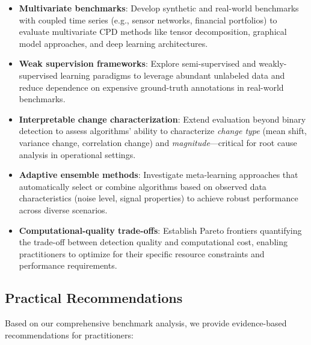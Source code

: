 \begin{itemize}
    \item \textbf{Multivariate benchmarks}: Develop synthetic and real-world benchmarks with coupled time series (e.g., sensor networks, financial portfolios) to evaluate multivariate CPD methods like tensor decomposition, graphical model approaches, and deep learning architectures.
    
    \item \textbf{Weak supervision frameworks}: Explore semi-supervised and weakly-supervised learning paradigms to leverage abundant unlabeled data and reduce dependence on expensive ground-truth annotations in real-world benchmarks.
    
    \item \textbf{Interpretable change characterization}: Extend evaluation beyond binary detection to assess algorithms' ability to characterize \textit{change type} (mean shift, variance change, correlation change) and \textit{magnitude}—critical for root cause analysis in operational settings.
    
    \item \textbf{Adaptive ensemble methods}: Investigate meta-learning approaches that automatically select or combine algorithms based on observed data characteristics (noise level, signal properties) to achieve robust performance across diverse scenarios.
    
    \item \textbf{Computational-quality trade-offs}: Establish Pareto frontiers quantifying the trade-off between detection quality and computational cost, enabling practitioners to optimize for their specific resource constraints and performance requirements.
\end{itemize}


\subsection{Practical Recommendations}

Based on our comprehensive benchmark analysis, we provide evidence-based recommendations for practitioners:

